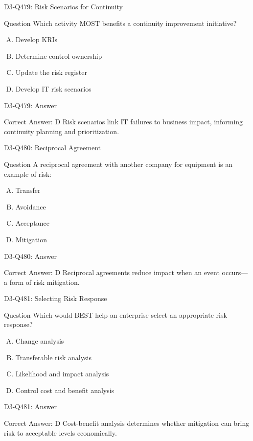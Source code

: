 \documentclass{beamer}
\begin{document}
\begin{frame}{D3-Q479: Risk Scenarios for Continuity}
	\begin{block}{Question}
		Which activity MOST benefits a continuity improvement initiative?
	\end{block}
	\begin{enumerate}[(A)]
		\item Develop KRIs
		\item Determine control ownership
		\item Update the risk register
		\item Develop IT risk scenarios
	\end{enumerate}
\end{frame}
\begin{frame}{D3-Q479: Answer}
	\begin{block}{Correct Answer: D}
		Risk scenarios link IT failures to business impact, informing continuity planning and prioritization.
	\end{block}
\end{frame}

\begin{frame}{D3-Q480: Reciprocal Agreement}
	\begin{block}{Question}
		A reciprocal agreement with another company for equipment is an example of risk:
	\end{block}
	\begin{enumerate}[(A)]
		\item Transfer
		\item Avoidance
		\item Acceptance
		\item Mitigation
	\end{enumerate}
\end{frame}
\begin{frame}{D3-Q480: Answer}
	\begin{block}{Correct Answer: D}
		Reciprocal agreements reduce impact when an event occurs—a form of risk mitigation.
	\end{block}
\end{frame}

\begin{frame}{D3-Q481: Selecting Risk Response}
	\begin{block}{Question}
		Which would BEST help an enterprise select an appropriate risk response?
	\end{block}
	\begin{enumerate}[(A)]
		\item Change analysis
		\item Transferable risk analysis
		\item Likelihood and impact analysis
		\item Control cost and benefit analysis
	\end{enumerate}
\end{frame}
\begin{frame}{D3-Q481: Answer}
	\begin{block}{Correct Answer: D}
		Cost-benefit analysis determines whether mitigation can bring risk to acceptable levels economically.
	\end{block}
\end{frame}
\end{document}
